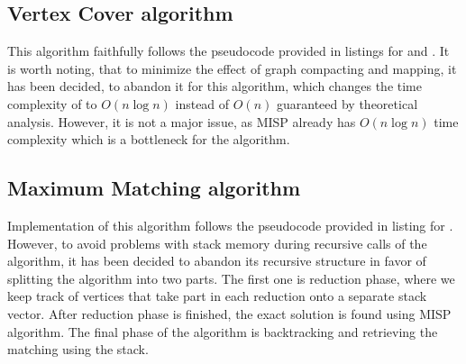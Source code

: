 \subsection{Vertex Cover algorithm}
This algorithm faithfully follows the pseudocode provided in listings for  and
. It is worth noting, that to minimize the effect of graph compacting and 
mapping, it has been decided, to abandon it for this algorithm, which changes the time complexity
of  to $O(n \log n)$ instead of $O(n)$ guaranteed by theoretical analysis. However, 
it is not a major issue, as \textsc{MISP} already has $O(n \log n)$ time complexity which is 
a bottleneck for the algorithm.

\subsection{Maximum Matching algorithm}
Implementation of this algorithm follows the pseudocode provided in listing for .
However, to avoid problems with stack memory during recursive calls of the algorithm, it has been decided
to abandon its recursive structure in favor of splitting the algorithm into two parts. The first one 
is reduction phase, where we keep track of vertices that take part in each reduction onto a separate stack
vector. After reduction phase is finished, the exact solution is found using \textsc{MISP} algorithm. The final
phase of the algorithm is backtracking and retrieving the matching using the stack.


